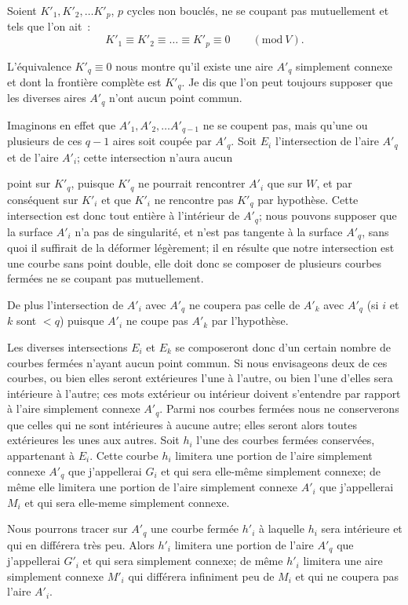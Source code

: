 \documentclass{article}
\begin{document}
Soient $K'_{1}, K'_{2}, \ldots K'_{p}$, $p$ cycles non bouclés, ne se coupant pas mutuellement et tels que l'on ait~:
\[ K'_{1} \equiv K'_{2} \equiv \ldots \equiv K'_{p} \equiv 0 \qquad (\text{mod}\ V). \]

L'équivalence $K'_{q} \equiv 0$ nous montre qu'il existe une aire $A'_{q}$ simplement connexe et dont la frontière complète est $K'_{q}$. Je dis que l'on peut toujours supposer que les diverses aires $A'_{q}$ n'ont aucun point commun.

Imaginons en effet que $A'_{1}, A'_{2}, \ldots A'_{q-1}$ ne se coupent pas, mais qu'une ou plusieurs de ces $q - 1$ aires soit coupée par $A'_{q}$. Soit $E_{i}$ l'intersection de l'aire $A'_{q}$ et de l'aire $A'_{i}$; cette intersection n'aura aucun

point sur $K'_{q}$, puisque $K'_{q}$ ne pourrait rencontrer $A'_{i}$ que sur $W$, et par conséquent sur $K'_{i}$ et que $K'_{i}$ ne rencontre pas $K'_{q}$ par hypothèse. Cette intersection est donc tout entière à l'intérieur de $A'_{q}$; nous pouvons supposer que la surface $A'_{i}$ n'a pas de singularité, et n'est pas tangente à la surface $A'_{q}$, sans quoi il suffirait de la déformer légèrement; il en résulte que notre intersection est une courbe sans point double, elle doit donc se composer de plusieurs courbes fermées ne se coupant pas mutuellement.

De plus l'intersection de $A'_{i}$ avec $A'_{q}$ ne coupera pas celle de $A'_{k}$ avec $A'_{q}$ (si $i$ et $k$ sont $< q$) puisque $A'_{i}$ ne coupe pas $A'_{k}$ par l'hypothèse.

Les diverses intersections $E_{i}$ et $E_{k}$ se composeront donc d'un certain nombre de courbes fermées n'ayant aucun point commun. Si nous envisageons deux de ces courbes, ou bien elles seront extérieures l'une à l'autre, ou bien l'une d'elles sera intérieure à l'autre; ces mots extérieur ou intérieur doivent s'entendre par rapport à l'aire simplement connexe $A'_{q}$. Parmi nos courbes fermées nous ne conserverons que celles qui ne sont intérieures à aucune autre; elles seront alors toutes extérieures les unes aux autres. Soit $h_{i}$ l'une des courbes fermées conservées, appartenant à $E_{i}$. Cette courbe $h_{i}$ limitera une portion de l'aire simplement connexe $A'_{q}$ que j'appellerai $G_{i}$ et qui sera elle-même simplement connexe; de même elle limitera une portion de l'aire simplement connexe $A'_{i}$ que j'appellerai $M_{i}$ et qui sera elle-meme simplement connexe.

Nous pourrons tracer sur $A'_{q}$ une courbe fermée $h'_{i}$ à laquelle $h_{i}$ sera intérieure et qui en différera très peu. Alors $h'_{i}$ limitera une portion de l'aire $A'_{q}$ que j'appellerai $G'_{i}$ et qui sera simplement connexe; de même $h'_{i}$ limitera une aire simplement connexe $M'_{i}$ qui différera infiniment peu de $M_{i}$ et qui ne coupera pas l'aire $A'_{i}$.
\end{document}
